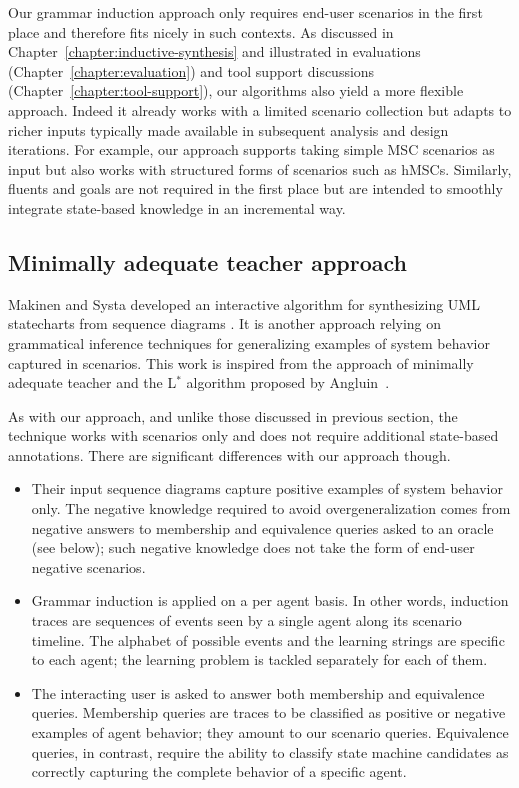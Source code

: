 Our grammar induction approach only requires end-user scenarios in the first place and therefore fits nicely in such contexts. As discussed in Chapter~\ref{chapter:inductive-synthesis} and illustrated in evaluations (Chapter~\ref{chapter:evaluation}) and tool support discussions (Chapter~\ref{chapter:tool-support}), our algorithms also yield a more flexible approach. Indeed it already works with a limited scenario collection but adapts to richer inputs typically made available in subsequent analysis and design iterations. For example, our approach supports taking simple MSC scenarios as input but also works with structured forms of scenarios such as hMSCs. Similarly, fluents and goals are not required in the first place but are intended to smoothly integrate state-based knowledge in an incremental way.


\subsection{Minimally adequate teacher approach}

Makinen and Systa developed an interactive algorithm for synthesizing UML statecharts from sequence diagrams \cite{Makinen:2001}. It is another approach relying on grammatical inference techniques for generalizing examples of system behavior captured in scenarios. This work is inspired from the approach of minimally adequate teacher and the L$^*$ algorithm proposed by Angluin~\cite{Angluin:1987}. 

As with our approach, and unlike those discussed in previous section, the technique works with scenarios only and does not require additional state-based annotations. There are significant differences with our approach though.
\begin{itemize}

\item Their input sequence diagrams capture positive examples of system behavior only. The negative knowledge required to avoid overgeneralization comes from negative answers to membership and equivalence queries asked to an oracle (see below); such negative knowledge does not take the form of end-user negative scenarios.

\item Grammar induction is applied on a per agent basis. In other words, induction traces are sequences of events seen by a single agent along its scenario timeline. The alphabet of possible events and the learning strings are specific to each agent; the learning problem is tackled separately for each of them.

\item The interacting user is asked to answer both membership and equivalence queries. Membership queries are traces to be classified as positive or negative examples of agent behavior; they amount to our scenario queries. Equivalence queries, in contrast, require the ability to classify state machine candidates as correctly capturing the complete behavior of a specific agent.
\end{itemize}


